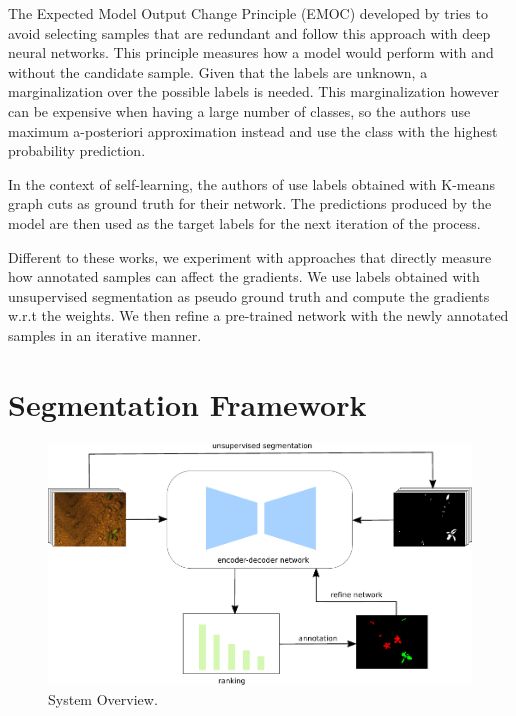 \documentclass[letterpaper, 10 pt, conference]{ieeeconf}  %
\begin{document}
The Expected Model Output Change Principle (EMOC) developed by \cite{freytag2014selecting} tries to avoid selecting samples that are redundant and \cite{kading2016active} follow this approach with deep neural networks. This principle measures how a model would perform with and without the candidate sample. Given that the labels are unknown, a marginalization over the possible labels is needed. This marginalization however can be expensive when having a large number of classes, so the authors use maximum a-posteriori approximation instead and use the class with the highest probability prediction.

In the context of self-learning, the authors of \cite{zhang2018self} use labels obtained with K-means graph cuts as ground truth for their network. The predictions produced by the model are then used as the target labels for the next iteration of the process.  

Different to these works, we experiment with approaches that directly measure how annotated samples can affect the gradients. We use labels obtained with unsupervised segmentation as pseudo ground truth and compute the gradients w.r.t the weights. We then refine a pre-trained network with the newly annotated samples in an iterative manner. 




\section{Segmentation Framework} \label{sec:approach}


    \begin{figure}
    \centering
    \includegraphics[scale=0.9]{pics/output_system_overview.pdf}
   		\caption{System Overview.}
		\label{fig:overview}    		
   \end{figure}
\end{document}
